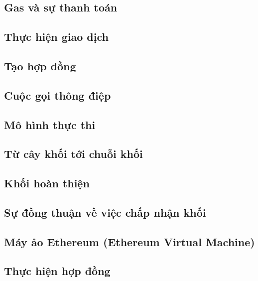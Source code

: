 \documentclass[12pt]{article}
\begin{document}
	\subsection{Gas và sự thanh toán}
	
	
	\subsection{Thực hiện giao dịch}
	
	
	\subsection{Tạo hợp đồng}
		

	\subsection{Cuộc gọi thông điệp}
			
	
	\subsection{Mô hình thực thi}
			
	
	\subsection{Từ cây khối tới chuỗi khối}
	
	
	\subsection{Khối hoàn thiện}
	
	
	\subsection{Sự đồng thuận về việc chấp nhận khối}
	

	\subsection{Máy ảo Ethereum (Ethereum Virtual Machine)}
	
	
	\subsection{Thực hiện hợp đồng}
	
	
\end{document}

